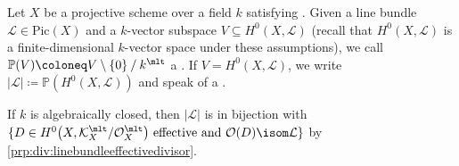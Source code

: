 \documentclass[wip, algebra]{bsteffan-lecturenotes}
\newcommand{\cO}{\mathcal{O}}
\newcommand{\cK}{\mathcal{K}}
\newcommand{\cL}{\mathcal{L}}
\renewcommand{\P}{\mathbb{P}}
\newcommand{\Pic}{\mathrm{Pic}}
\begin{document}
\begin{definition}
	Let $X$ be a projective scheme over a field $k$ satisfying .
	Given a line bundle $\cL \in \Pic(X)$ and a $k$-vector subspace $V \subseteq H^0(X, \cL)$ (recall that $H^0(X, \cL)$ is a finite-dimensional $k$-vector space under these assumptions), we call $\P(V) \coloneq V \setminus \{0\} \mathbin{/} k^\mlt$ a .
	If $V = H^0(X, \cL)$, we write $|\cL| \coloneq \P(H^0(X, \cL))$ and speak of a .
\end{definition}
\begin{remark}
	If $k$ is algebraically closed, then $|\cL|$ is in bijection with $\{D \in H^0\big(X, \cK_X^\mlt / \cO_X^\mlt\big) \text{ effective and } \cO(D) \isom \cL\}$ by \cref{prp:div:linebundleeffectivedivisor}.
\end{remark}
\end{document}
